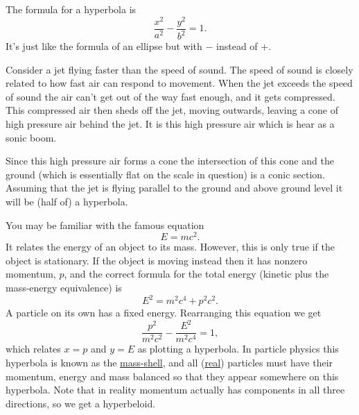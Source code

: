 \documentclass[fleqn]{LectureClass/LectureClass}
\begin{document}
    The formula for a hyperbola is
    \begin{equation}
        \frac{x^2}{a^2} - \frac{y^2}{b^2} = 1.
    \end{equation}
    It's just like the formula of an ellipse but with \(-\) instead of \(+\).
    
    \begin{app}{}{}
        Consider a jet flying faster than the speed of sound.
        The speed of sound is closely related to how fast air can respond to movement.
        When the jet exceeds the speed of sound the air can't get out of the way fast enough, and it gets compressed.
        This compressed air then sheds off the jet, moving outwards, leaving a cone of high pressure air behind the jet.
        It is this high pressure air which is hear as a sonic boom.
        
        Since this high pressure air forms a cone the intersection of this cone and the ground (which is essentially flat on the scale in question) is a conic section.
        Assuming that the jet is flying parallel to the ground and above ground level it will be (half of) a hyperbola.
    \end{app}
    
    \begin{remark}{}{}
        You may be familiar with the famous equation
        \begin{equation}
            E = mc^2.
        \end{equation}
        It relates the energy of an object to its mass.
        However, this is only true if the object is stationary.
        If the object is moving instead then it has nonzero momentum, \(p\), and the correct formula for the total energy (kinetic plus the mass-energy equivalence) is
        \begin{equation}
            E^2 = m^2c^4 + p^2c^2.
        \end{equation}
        A particle on its own has a fixed energy.
        Rearranging this equation we get
        \begin{equation}
            \frac{p^2}{m^2c^2} - \frac{E^2}{m^2c^4} = 1,
        \end{equation}
        which relates \(x = p\) and \(y = E\) as plotting a hyperbola.
        In particle physics this hyperbola is known as the \href{https://en.wikipedia.org/wiki/On_shell_and_off_shell}{mass-shell}, and all (\href{https://en.wikipedia.org/wiki/Virtual_particle}{real}) particles must have their momentum, energy and mass balanced so that they appear somewhere on this hyperbola.
        Note that in reality momentum actually has components in all three directions, so we get a hyperbeloid.
    \end{remark}
    
\end{document}
